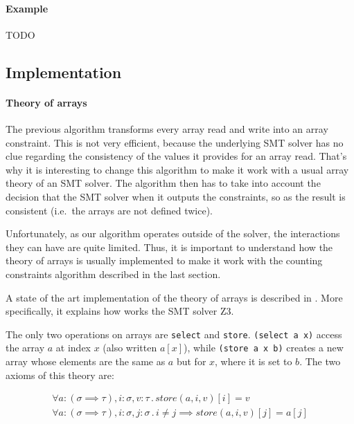 \documentclass[]{article}
\begin{document}
{{\paragraph{Example}\label{example-1}

TODO
}

\subsection{Implementation}

\paragraph{Theory of arrays} The previous algorithm transforms every array read and write into an
array constraint. This is not very efficient, because the underlying SMT
solver has no clue regarding the consistency of the values it provides
for an array read. That's why it is interesting to change this algorithm
to make it work with a usual array theory of an SMT solver. The
algorithm then has to take into account the decision that the SMT solver
when it outputs the constraints, so as the result is consistent
(i.e.~the arrays are not defined twice).

Unfortunately, as our algorithm operates outside of the solver, the
interactions they can have are quite limited. Thus, it is important to
understand how the theory of arrays is usually implemented to make it
work with the counting constraints algorithm described in the last
section.

A state of the art implementation of the theory of arrays is described
in \cite{de2009generalized}. More specifically, it
explains how works the SMT solver Z3.

The only two operations on arrays are \texttt{select} and
\texttt{store}. \texttt{(select\ a\ x)} access the array $a$ at index
$x$ (also written $a[x]$), while \texttt{(store\ a\ x\ b)} creates a
new array whose elements are the same as $a$ but for $x$, where it
is set to $b$. The two axioms of this theory are:

\begin{subequations}
    \begin{align}
        \forall a:(\sigma \implies \tau), i:\sigma, v:\tau\, .\, store(a, i, v)[i] = v
        \\
        \forall a:(\sigma \implies \tau), i:\sigma, j:\sigma\, .\, i \neq j \implies store(a, i, v)[j] = a[j]
    \end{align}



\end{subequations}}
\end{document}
